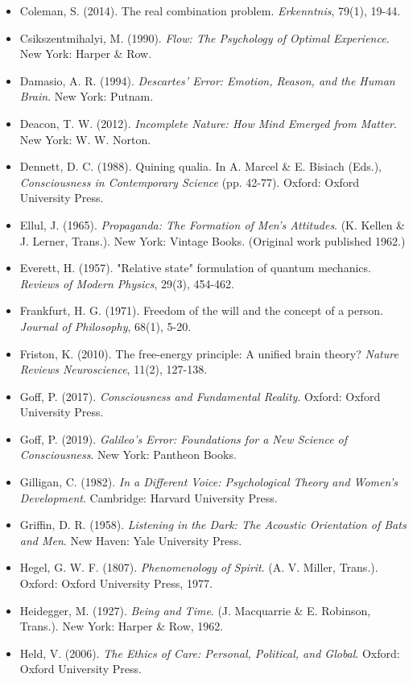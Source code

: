 \begin{itemize}[nosep,leftmargin=*]
  \item Coleman, S. (2014). The real combination problem. \textit{Erkenntnis}, 79(1), 19-44.
  \item Csikszentmihalyi, M. (1990). \textit{Flow: The Psychology of Optimal Experience}. New York: Harper \& Row.
  \item Damasio, A. R. (1994). \textit{Descartes' Error: Emotion, Reason, and the Human Brain}. New York: Putnam.
  \item Deacon, T. W. (2012). \textit{Incomplete Nature: How Mind Emerged from Matter}. New York: W. W. Norton.
  \item Dennett, D. C. (1988). Quining qualia. In A. Marcel \& E. Bisiach (Eds.), \textit{Consciousness in Contemporary Science} (pp. 42-77). Oxford: Oxford University Press.
  \item Ellul, J. (1965). \textit{Propaganda: The Formation of Men's Attitudes}. (K. Kellen \& J. Lerner, Trans.). New York: Vintage Books. (Original work published 1962.)
  \item Everett, H. (1957). "Relative state" formulation of quantum mechanics. \textit{Reviews of Modern Physics}, 29(3), 454-462.
  \item Frankfurt, H. G. (1971). Freedom of the will and the concept of a person. \textit{Journal of Philosophy}, 68(1), 5-20.
  \item Friston, K. (2010). The free-energy principle: A unified brain theory? \textit{Nature Reviews Neuroscience}, 11(2), 127-138.
  \item Goff, P. (2017). \textit{Consciousness and Fundamental Reality}. Oxford: Oxford University Press.
  \item Goff, P. (2019). \textit{Galileo's Error: Foundations for a New Science of Consciousness}. New York: Pantheon Books.
  \item Gilligan, C. (1982). \textit{In a Different Voice: Psychological Theory and Women's Development}. Cambridge: Harvard University Press.
  \item Griffin, D. R. (1958). \textit{Listening in the Dark: The Acoustic Orientation of Bats and Men}. New Haven: Yale University Press.
  \item Hegel, G. W. F. (1807). \textit{Phenomenology of Spirit}. (A. V. Miller, Trans.). Oxford: Oxford University Press, 1977.
  \item Heidegger, M. (1927). \textit{Being and Time}. (J. Macquarrie \& E. Robinson, Trans.). New York: Harper \& Row, 1962.
  \item Held, V. (2006). \textit{The Ethics of Care: Personal, Political, and Global}. Oxford: Oxford University Press.

\end{itemize}
